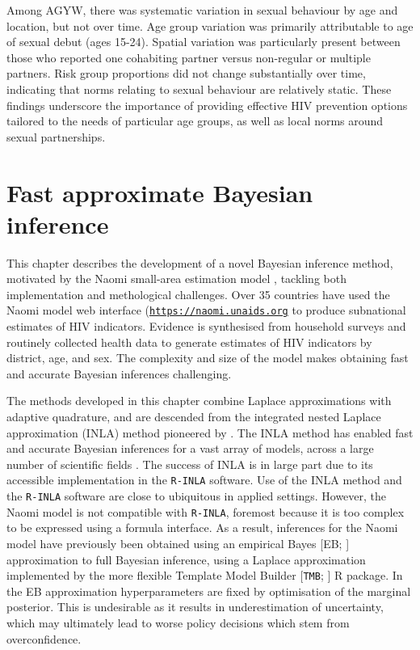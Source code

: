 \documentclass[a4paper, nobind]{templates/ociamthesis}
\begin{document}
Among AGYW, there was systematic variation in sexual behaviour by age and location, but not over time.
Age group variation was primarily attributable to age of sexual debut (ages 15-24).
Spatial variation was particularly present between those who reported one cohabiting partner versus non-regular or multiple partners.
Risk group proportions did not change substantially over time, indicating that norms relating to sexual behaviour are relatively static.
These findings underscore the importance of providing effective HIV prevention options tailored to the needs of particular age groups, as well as local norms around sexual partnerships.

\hypertarget{naomi-aghq}{%
\chapter{Fast approximate Bayesian inference}\label{naomi-aghq}}

\adjustmtc
\minitoc
{}

This chapter describes the development of a novel Bayesian inference method, motivated by the Naomi small-area estimation model \autocite{eaton2021naomi}, tackling both implementation and methological challenges.
Over 35 countries \autocite{unaids2023global} have used the Naomi model web interface (\href{https://naomi.unaids.org}{\texttt{https://naomi.unaids.org}} to produce subnational estimates of HIV indicators.
Evidence is synthesised from household surveys and routinely collected health data to generate estimates of HIV indicators by district, age, and sex.
The complexity and size of the model makes obtaining fast and accurate Bayesian inferences challenging.

The methods developed in this chapter combine Laplace approximations with adaptive quadrature, and are descended from the integrated nested Laplace approximation (INLA) method pioneered by \textcite{rue2009approximate}.
The INLA method has enabled fast and accurate Bayesian inferences for a vast array of models, across a large number of scientific fields \autocite{rue2017bayesian}.
The success of INLA is in large part due to its accessible implementation in the \texttt{R-INLA} software.
Use of the INLA method and the \texttt{R-INLA} software are close to ubiquitous in applied settings.
However, the Naomi model is not compatible with \texttt{R-INLA}, foremost because it is too complex to be expressed using a formula interface.
As a result, inferences for the Naomi model have previously been obtained using an empirical Bayes {[}EB; \textcite{casella1985introduction}{]} approximation to full Bayesian inference, using a Laplace approximation implemented by the more flexible Template Model Builder {[}\texttt{TMB}; \textcite{kristensen2016tmb}{]} R package.
In the EB approximation hyperparameters are fixed by optimisation of the marginal posterior.
This is undesirable as it results in underestimation of uncertainty, which may ultimately lead to worse policy decisions which stem from overconfidence.
\end{document}
